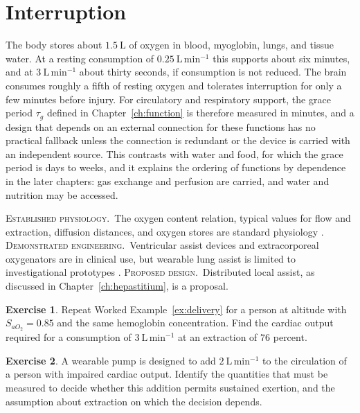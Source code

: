 \documentclass[11pt,openany]{book}
\theoremstyle{definition}
\newtheorem{exercise}{Exercise}[chapter]
\theoremstyle{remark}
\newcommand{\est}{\textsc{Established physiology.}\ }
\newcommand{\dem}{\textsc{Demonstrated engineering.}\ }
\newcommand{\pro}{\textsc{Proposed design.}\ }
\begin{document}
\section{Interruption}

The body stores about $1.5\ \mathrm{L}$ of oxygen in blood, myoglobin, lungs, and tissue water. At a resting consumption of $0.25\ \mathrm{L\,min^{-1}}$ this supports about six minutes, and at $3\ \mathrm{L\,min^{-1}}$ about thirty seconds, if consumption is not reduced. The brain consumes roughly a fifth of resting oxygen and tolerates interruption for only a few minutes before injury. For circulatory and respiratory support, the grace period $\tau_g$ defined in Chapter~\ref{ch:function} is therefore measured in minutes, and a design that depends on an external connection for these functions has no practical fallback unless the connection is redundant or the device is carried with an independent source. This contrasts with water and food, for which the grace period is days to weeks, and it explains the ordering of functions by dependence in the later chapters: gas exchange and perfusion are carried, and water and nutrition may be accessed.

\begin{evidence}
\est The oxygen content relation, typical values for flow and extraction, diffusion distances, and oxygen stores are standard physiology \cite{guyton2021,boron2017}. \dem Ventricular assist devices and extracorporeal oxygenators are in clinical use, but wearable lung assist is limited to investigational prototypes \cite{mehra2017}. \pro Distributed local assist, as discussed in Chapter~\ref{ch:hepastitium}, is a proposal.
\end{evidence}

\begin{exercise}
Repeat Worked Example~\ref{ex:delivery} for a person at altitude with $S_{aO_2}=0.85$ and the same hemoglobin concentration. Find the cardiac output required for a consumption of $3\ \mathrm{L\,min^{-1}}$ at an extraction of $76$ percent.
\end{exercise}

\begin{exercise}
A wearable pump is designed to add $2\ \mathrm{L\,min^{-1}}$ to the circulation of a person with impaired cardiac output. Identify the quantities that must be measured to decide whether this addition permits sustained exertion, and the assumption about extraction on which the decision depends.
\end{exercise}
\end{document}
